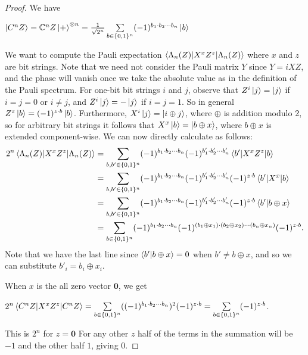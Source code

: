 \documentclass[12pt]{dalthesis}
\begin{document}
\begin{proof}
We have 
\begin{center}
$\ket{C^n Z} = \mathbb{C}^n Z \ket{+}^{\otimes n} = \frac{1}{\sqrt{2^n}} \sum\limits_{b \in \{0, 1\}^n} (-1)^{b_1 \cdot b_2 \cdots b_n} \ket{b}$
\end{center}
We want to compute the Pauli expectation $\braket{\Lambda_n (Z)|X^xZ^z|\Lambda_n (Z)}$ where $x$ and $z$ are bit strings. Note that we need not consider the Pauli matrix $Y$ since $Y = iXZ$, and the phase will vanish once we take the absolute value as in the definition of the Pauli spectrum. For one-bit bit strings $i$ and $j$, observe that $Z^i \ket{j} = \ket{j}$ if $i=j=0$ or $i \neq j$, and $Z^i \ket{j} = -\ket{j}$ if $i=j=1$. So in general $Z^z \ket{b} = (-1)^{z \cdot b}\ket{b}$. Furthermore, $X^i \ket{j} = \ket{i \oplus j}$, where $\oplus$ is addition modulo 2, so for arbitrary bit strings it follows that $X^x\ket{b} = \ket{b \oplus x}$, where $b \oplus x$ is extended component-wise. We can now directly calculate as follows:
\begin{equation*}
\begin{split}
2^n\braket{\Lambda_n (Z)|X^xZ^z|\Lambda_n (Z)} & = \sum\limits_{b, b' \in \{0, 1\}^n} (-1)^{b_1 \cdot b_2 \cdots b_n} (-1)^{b'_1 \cdot b'_2 \cdots b'_n} \braket{b'|X^xZ^z|b} \\
& = \sum\limits_{b, b' \in \{0, 1\}^n} (-1)^{b_1 \cdot b_2 \cdots b_n} (-1)^{b'_1 \cdot b'_2 \cdots b'_n} (-1)^{z \cdot b} \braket{b'|X^x|b} \\
& = \sum\limits_{b, b' \in \{0, 1\}^n} (-1)^{b_1 \cdot b_2 \cdots b_n} (-1)^{b'_1 \cdot b'_2 \cdots b'_n} (-1)^{z \cdot b} \braket{b'|b \oplus x} \\
& = \sum\limits_{b \in \{0, 1\}^n} (-1)^{b_1 \cdot b_2 \cdots b_n} (-1)^{(b_1 \oplus x_1) \cdot (b_2 \oplus x_2) \cdots (b_n \oplus x_n)} (-1)^{z \cdot b}.
\end{split}
\end{equation*}
Note that we have the last line since $\braket{b'|b \oplus x} = 0$ when $b' \neq b \oplus x$, and so we can substitute $b'_i = b_i \oplus x_i$. 

When $x$ is the all zero vector $\textbf{0}$, we get 
\begin{center}
$2^n\braket{C^n Z|X^xZ^z|C^n Z} = \sum\limits_{b \in \{0, 1\}^n} ((-1)^{b_1 \cdot b_2 \cdots b_n})^2  (-1)^{z \cdot b} = \sum\limits_{b \in \{0, 1\}^n} (-1)^{z \cdot b}$.
\end{center} This is $2^n$ for $z = \textbf{0}$
 For any other $z$ half of the terms in the summation will be $-1$ and the other half $1$, giving $0$. 


\end{proof}
\end{document}
